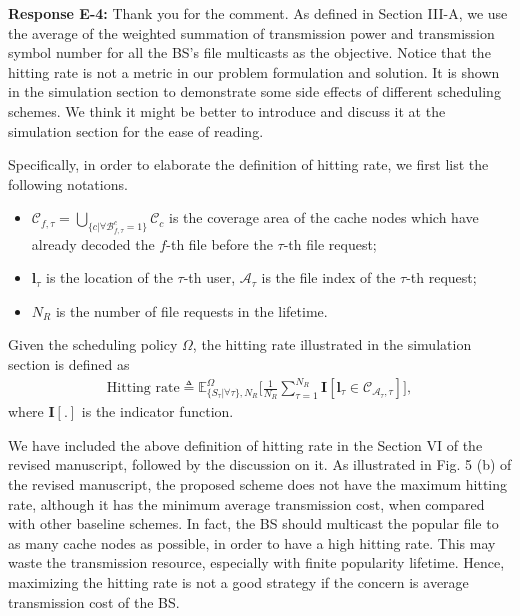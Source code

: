 \documentclass[12pt,onecolumn]{IEEEtran}
\newcommand{\blue}{\color{blue}}
\newcommand{\spaceblank}{\vskip 4mm}
\begin{document}
\spaceblank

{\blue \textbf{Response E-4:} 
	Thank you for the comment. As defined in Section III-A, we use the average of the weighted summation of transmission power and transmission symbol number for all the BS's file multicasts as the objective. Notice that the hitting rate is not a metric in our problem formulation and solution. It is shown in the simulation section to demonstrate some side effects of different scheduling schemes. We think it might be better to introduce and discuss it at the simulation section for the ease of reading. 
	
	Specifically, in order to elaborate the definition of hitting rate, we first list the following notations.
	\begin{itemize} 
		\item 	 $ \mathcal{C}_{f,\tau} = \bigcup\limits_{\{c|\forall\mathcal{B}_{f,\tau}^c=1\}} \mathcal{C}_c $ is the coverage area of the cache nodes which have already decoded the $f$-th file before the $\tau$-th file request;
		\item $ \mathbf{l}_{\tau} $ is the location of the $\tau$-th user, $\mathcal{A}_{\tau}$ is the file index of the $\tau$-th request;
		\item $N_R$ is the number of file requests in the lifetime.
		\end{itemize}
	Given the scheduling policy $\Omega$, the hitting rate illustrated in the simulation section is defined as
	\begin{align}
	\text{Hitting rate}\triangleq\mathbb{E}_{\{S_{\tau}|\forall \tau\},N_R}^{\Omega}\bigg[\frac{1}{N_R}\sum_{\tau=1}^{N_R}\mathbf{I}  [\mathbf{l}_{\tau} \in \mathcal{C}_{\mathcal{A}_{\tau},\tau}]\bigg],
	\end{align}
	where $\mathbf{I}[.]$ is the indicator function.
	
	We have included the above definition of hitting rate in the Section VI of the revised manuscript, followed by the discussion on it. As illustrated in Fig. 5 (b) of the revised manuscript, the proposed scheme does not have the maximum hitting rate, although it has the minimum average transmission cost, when compared with other baseline schemes. In fact, the BS should multicast the popular file to as many cache nodes as possible, in order to have a high hitting rate. This may waste the transmission resource, especially with finite popularity lifetime. Hence, maximizing the hitting rate is not a good strategy if the concern is average transmission cost of the BS.
}
\end{document}
